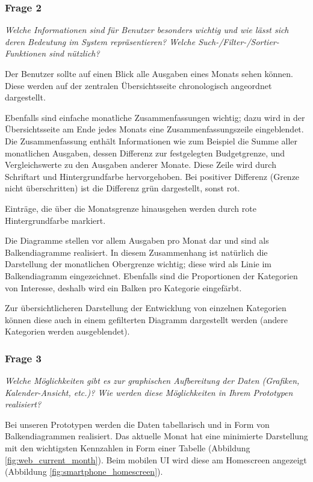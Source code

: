 \subsubsection{Frage 2}

\emph{Welche Informationen sind für Benutzer besonders wichtig und wie lässt sich
deren Bedeutung im System repräsentieren? Welche Such-/Filter-/Sortier-Funktio\-nen sind nützlich?}

\vspace{2mm}

Der Benutzer sollte auf einen Blick alle Ausgaben eines Monats sehen k\"onnen. Diese
werden auf der zentralen \"Ubersichtsseite chronologisch angeordnet dargestellt.

Ebenfalls sind einfache monatliche Zusammenfassungen wichtig; dazu wird in der
\"Ubersichtsseite am Ende jedes Monats eine Zusammenfassungszeile eingeblendet.
Die Zusammenfassung enth\"alt Informationen wie zum Beispiel die Summe aller monatlichen
Ausgaben, dessen Differenz zur festgelegten Budgetgrenze, und Vergleichswerte zu den Ausgaben
anderer Monate. Diese Zeile wird durch Schriftart und Hintergrundfarbe hervorgehoben.
Bei positiver Differenz (Grenze nicht \"uberschritten) ist die Differenz gr\"un dargestellt,
sonst rot.

Eintr\"age, die \"uber die Monatsgrenze hinausgehen werden durch rote Hintergrundfarbe
markiert.

Die Diagramme stellen vor allem Ausgaben pro Monat dar und sind als Balkendiagramme realisiert.
In diesem Zusammenhang ist nat\"urlich die Darstellung der monatlichen Obergrenze wichtig;
diese wird als Linie im Balkendiagramm eingezeichnet. Ebenfalls sind die Proportionen der Kategorien
von Interesse, deshalb wird ein Balken pro Kategorie eingef\"arbt.

Zur \"ubersichtlicheren Darstellung der Entwicklung von einzelnen Kategorien k\"onnen
diese auch in einem gefilterten Diagramm dargestellt werden (andere Kategorien werden
ausgeblendet).



\newpage
\subsubsection{Frage 3}

\emph{Welche Möglichkeiten gibt es zur graphischen Aufbereitung der Daten 
(Grafiken, Kalender-Ansicht, etc.)? Wie werden diese Möglichkeiten in Ihrem Prototypen realisiert?}

\vspace{2mm}
Bei unseren Prototypen werden die Daten tabellarisch und in Form von Balkendiagrammen realisiert.
Das aktuelle Monat hat eine minimierte Darstellung mit den wichtigsten Kennzahlen in Form einer 
Tabelle (Abbildung \ref{fig:web_current_month}). Beim mobilen UI wird diese am Homescreen angezeigt
(Abbildung \ref{fig:smartphone_homescreen}).

